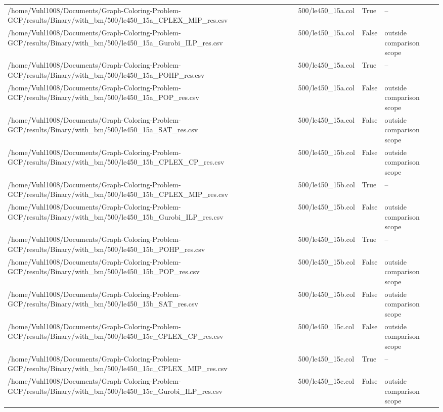 \begin{table}[htbp]
\begin{tabular}{llll}
/home/Vuhl1008/Documents/Graph-Coloring-Problem-GCP/results/Binary/with\_bm/500/le450\_15a\_CPLEX\_MIP\_res.csv & 500/le450\_15a.col & True & -- \\
/home/Vuhl1008/Documents/Graph-Coloring-Problem-GCP/results/Binary/with\_bm/500/le450\_15a\_Gurobi\_ILP\_res.csv & 500/le450\_15a.col & False & outside comparison scope \\
/home/Vuhl1008/Documents/Graph-Coloring-Problem-GCP/results/Binary/with\_bm/500/le450\_15a\_POHP\_res.csv & 500/le450\_15a.col & True & -- \\
/home/Vuhl1008/Documents/Graph-Coloring-Problem-GCP/results/Binary/with\_bm/500/le450\_15a\_POP\_res.csv & 500/le450\_15a.col & False & outside comparison scope \\
/home/Vuhl1008/Documents/Graph-Coloring-Problem-GCP/results/Binary/with\_bm/500/le450\_15a\_SAT\_res.csv & 500/le450\_15a.col & False & outside comparison scope \\
/home/Vuhl1008/Documents/Graph-Coloring-Problem-GCP/results/Binary/with\_bm/500/le450\_15b\_CPLEX\_CP\_res.csv & 500/le450\_15b.col & False & outside comparison scope \\
/home/Vuhl1008/Documents/Graph-Coloring-Problem-GCP/results/Binary/with\_bm/500/le450\_15b\_CPLEX\_MIP\_res.csv & 500/le450\_15b.col & True & -- \\
/home/Vuhl1008/Documents/Graph-Coloring-Problem-GCP/results/Binary/with\_bm/500/le450\_15b\_Gurobi\_ILP\_res.csv & 500/le450\_15b.col & False & outside comparison scope \\
/home/Vuhl1008/Documents/Graph-Coloring-Problem-GCP/results/Binary/with\_bm/500/le450\_15b\_POHP\_res.csv & 500/le450\_15b.col & True & -- \\
/home/Vuhl1008/Documents/Graph-Coloring-Problem-GCP/results/Binary/with\_bm/500/le450\_15b\_POP\_res.csv & 500/le450\_15b.col & False & outside comparison scope \\
/home/Vuhl1008/Documents/Graph-Coloring-Problem-GCP/results/Binary/with\_bm/500/le450\_15b\_SAT\_res.csv & 500/le450\_15b.col & False & outside comparison scope \\
/home/Vuhl1008/Documents/Graph-Coloring-Problem-GCP/results/Binary/with\_bm/500/le450\_15c\_CPLEX\_CP\_res.csv & 500/le450\_15c.col & False & outside comparison scope \\
/home/Vuhl1008/Documents/Graph-Coloring-Problem-GCP/results/Binary/with\_bm/500/le450\_15c\_CPLEX\_MIP\_res.csv & 500/le450\_15c.col & True & -- \\
/home/Vuhl1008/Documents/Graph-Coloring-Problem-GCP/results/Binary/with\_bm/500/le450\_15c\_Gurobi\_ILP\_res.csv & 500/le450\_15c.col & False & outside comparison scope \\

\end{tabular}
\end{table}
